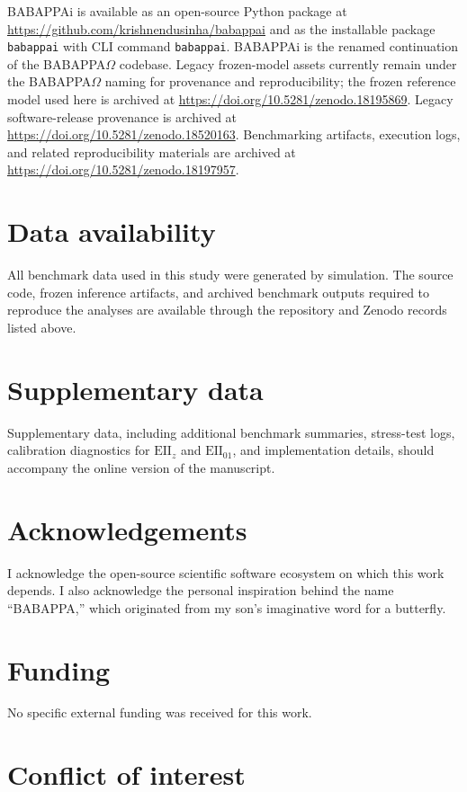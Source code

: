 \documentclass[11pt]{article}
\begin{document}
BABAPPAi is available as an open-source Python package at \url{https://github.com/krishnendusinha/babappai} and as the installable package \texttt{babappai} with CLI command \texttt{babappai}. BABAPPAi is the renamed continuation of the BABAPPA$\Omega$ codebase. Legacy frozen-model assets currently remain under the BABAPPA$\Omega$ naming for provenance and reproducibility; the frozen reference model used here is archived at \url{https://doi.org/10.5281/zenodo.18195869}. Legacy software-release provenance is archived at \url{https://doi.org/10.5281/zenodo.18520163}. Benchmarking artifacts, execution logs, and related reproducibility materials are archived at \url{https://doi.org/10.5281/zenodo.18197957}.

\section*{Data availability}

All benchmark data used in this study were generated by simulation. The source code, frozen inference artifacts, and archived benchmark outputs required to reproduce the analyses are available through the repository and Zenodo records listed above.

\section*{Supplementary data}

Supplementary data, including additional benchmark summaries, stress-test logs, calibration diagnostics for $\mathrm{EII}_{z}$ and $\mathrm{EII}_{01}$, and implementation details, should accompany the online version of the manuscript.

\section*{Acknowledgements}

I acknowledge the open-source scientific software ecosystem on which this work depends. I also acknowledge the personal inspiration behind the name ``BABAPPA,'' which originated from my son's imaginative word for a butterfly.

\section*{Funding}

No specific external funding was received for this work.

\section*{Conflict of interest}
\end{document}
